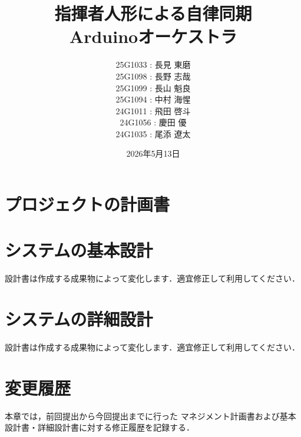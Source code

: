 \documentclass[lualatex,book,paper=a4paper,jafontsize=11.5pt,jafontscale=1.05,oneside]{jlreq}
\title{指揮者人形による自律同期\\Arduinoオーケストラ}
\author{
  25G1033 : 長見 東磨\\
  25G1098 : 長野 志哉\\
  25G1099 : 長山 魁良\\
  25G1094 : 中村 海惺\\
  24G1011 : 飛田 啓斗\\
  24G1056 : 慶田 優\phantom{磨}\\
  24G1035 : 尾添 遼太
}
\date{2026年5月13日}
\begin{document}
\maketitle

\setcounter{tocdepth}{2}
\tableofcontents \thispagestyle{empty}

\chapter{プロジェクトの計画書}\label{chap:project-plan}\setcounter{page}{1}



\chapter{システムの基本設計}

設計書は作成する成果物によって変化します．適宜修正して利用してください．






\chapter{システムの詳細設計}

設計書は作成する成果物によって変化します．適宜修正して利用してください．






\chapter{変更履歴}\label{chap:revision-history}

本章では，前回提出から今回提出までに行った
マネジメント計画書および基本設計書・詳細設計書に対する修正履歴を記録する．


\end{document}
